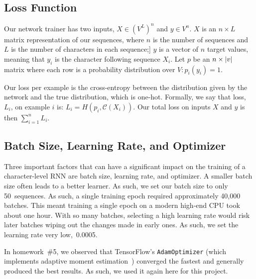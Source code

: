 \documentclass{article}
\DeclarePairedDelimiter\abs{\lvert}{\rvert}%
\begin{document}
\subsection{Loss Function}


Our network trainer has two inputs, ${X \in \left(V^L\right)^n}$ and $y \in V^n$. $X$ is an $n \times L$ matrix representation of our sequences, where $n$ is the number of sequences and $L$ is the number of characters in each sequence;] $y$ is a vector of $n$ target values, meaning that $y_i$ is the character following sequence $X_i$. Let $p$ be an $n \times \abs*{v}$ matrix where each row is a probability distribution over $V : p_i(y_i) = 1$.

Our loss per example is the cross-entropy between the distribution given by the network and the true distribution, which is one-hot. Formally, we say that loss,~$L_i$, on example $i$ is: $L_i = H(p_i, \mathcal{C}(X_i))$. Our total loss on inputs $X$ and $y$ is then $\sum_{i=1}^{n} L_i$.

\subsection{Batch Size, Learning Rate, and Optimizer}

Three important factors that can have a significant impact on the training of a character-level RNN are batch size, learning rate, and optimizer.  A smaller batch size often leads to a better learner.  As such, we set our batch size to only 50~sequences.  As such, a single training epoch required approximately 40,000 batches. This meant training a single epoch on a modern high-end CPU took about one hour.  With so many batches, selecting a high learning rate would risk later batches wiping out the changes made in early ones.  As such, we set the learning rate very low,~0.0005. 

In homework~\#5, we observed that TensorFlow's \texttt{AdamOptimizer} (which implements adaptive moment estimation~\cite{kingma2014}) converged the fastest and generally produced the best results.  As such, we used it again here for this project.  
\end{document}
